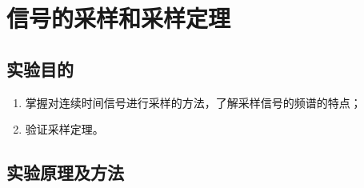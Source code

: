 \chapter{信号的采样和采样定理}%
\label{cha:信号的采样和采样定理}

\section{实验目的}%
\label{sec:实验目的\arabic{chapter}}

\begin{enumerate}
	\item 掌握对连续时间信号进行采样的方法，了解采样信号的频谱的特点；
	\item 验证采样定理。
\end{enumerate}

\section{实验原理及方法}%
\label{sec:实验原理及方法\arabic{chapter}}

